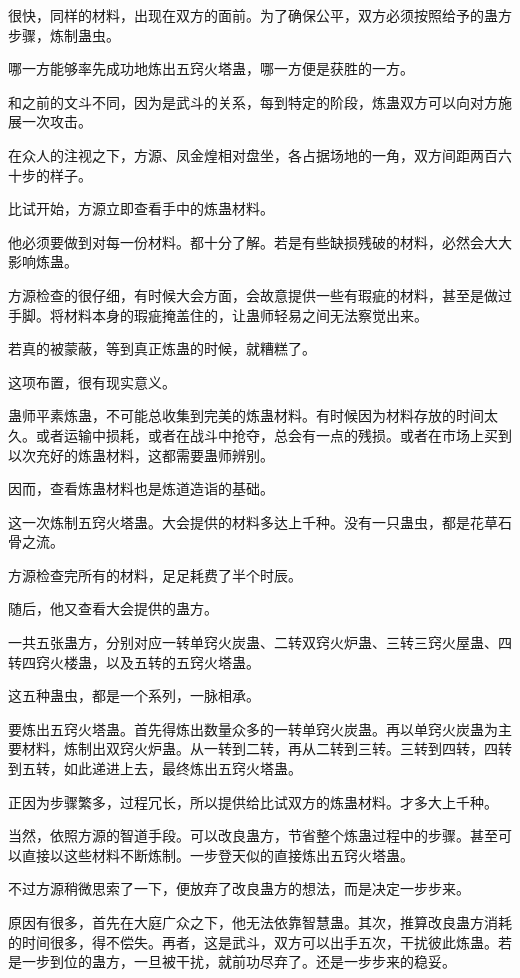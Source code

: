 \begin{this_body}
很快，同样的材料，出现在双方的面前。为了确保公平，双方必须按照给予的蛊方步骤，炼制蛊虫。

哪一方能够率先成功地炼出五窍火塔蛊，哪一方便是获胜的一方。

和之前的文斗不同，因为是武斗的关系，每到特定的阶段，炼蛊双方可以向对方施展一次攻击。

在众人的注视之下，方源、凤金煌相对盘坐，各占据场地的一角，双方间距两百六十步的样子。

比试开始，方源立即查看手中的炼蛊材料。

他必须要做到对每一份材料。都十分了解。若是有些缺损残破的材料，必然会大大影响炼蛊。

方源检查的很仔细，有时候大会方面，会故意提供一些有瑕疵的材料，甚至是做过手脚。将材料本身的瑕疵掩盖住的，让蛊师轻易之间无法察觉出来。

若真的被蒙蔽，等到真正炼蛊的时候，就糟糕了。

这项布置，很有现实意义。

蛊师平素炼蛊，不可能总收集到完美的炼蛊材料。有时候因为材料存放的时间太久。或者运输中损耗，或者在战斗中抢夺，总会有一点的残损。或者在市场上买到以次充好的炼蛊材料，这都需要蛊师辨别。

因而，查看炼蛊材料也是炼道造诣的基础。

这一次炼制五窍火塔蛊。大会提供的材料多达上千种。没有一只蛊虫，都是花草石骨之流。

方源检查完所有的材料，足足耗费了半个时辰。

随后，他又查看大会提供的蛊方。

一共五张蛊方，分别对应一转单窍火炭蛊、二转双窍火炉蛊、三转三窍火屋蛊、四转四窍火楼蛊，以及五转的五窍火塔蛊。

这五种蛊虫，都是一个系列，一脉相承。

要炼出五窍火塔蛊。首先得炼出数量众多的一转单窍火炭蛊。再以单窍火炭蛊为主要材料，炼制出双窍火炉蛊。从一转到二转，再从二转到三转。三转到四转，四转到五转，如此递进上去，最终炼出五窍火塔蛊。

正因为步骤繁多，过程冗长，所以提供给比试双方的炼蛊材料。才多大上千种。

当然，依照方源的智道手段。可以改良蛊方，节省整个炼蛊过程中的步骤。甚至可以直接以这些材料不断炼制。一步登天似的直接炼出五窍火塔蛊。

不过方源稍微思索了一下，便放弃了改良蛊方的想法，而是决定一步步来。

原因有很多，首先在大庭广众之下，他无法依靠智慧蛊。其次，推算改良蛊方消耗的时间很多，得不偿失。再者，这是武斗，双方可以出手五次，干扰彼此炼蛊。若是一步到位的蛊方，一旦被干扰，就前功尽弃了。还是一步步来的稳妥。


\end{this_body}
